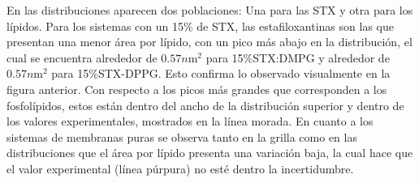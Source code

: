 En las distribuciones aparecen dos poblaciones: Una para las STX y otra para los l\'{i}pidos. Para los sistemas con un 15\% de STX, las estafiloxantinas son las que presentan una menor \'{a}rea por l\'{i}pido, con un pico m\'{a}s abajo en la distribuci\'{o}n, el cual se encuentra alrededor de $0.57n\mathrm{m}^2$ para 15\%STX:DMPG y alrededor de $0.57n\mathrm{m}^2$ para 15\%STX-DPPG. Esto confirma lo observado visualmente en la figura anterior. Con respecto a los picos m\'{a}s grandes  que corresponden a los fosfol\'{i}pidos, estos est\'{a}n dentro del ancho de la distribuci\'{o}n superior y dentro de los valores experimentales, mostrados en la l\'{i}nea morada. En cuanto a los sistemas de membranas puras se observa tanto en la grilla como en las distribuciones que el \'{a}rea por l\'{i}pido presenta una variaci\'{o}n baja,  la cual hace que el valor experimental (l\'{i}nea p\'{u}rpura) no est\'{e} dentro la incertidumbre.\\

